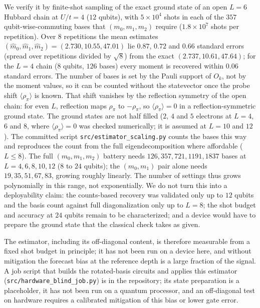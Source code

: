 \documentclass[aps,prb,onecolumn,superscriptaddress,longbibliography,floatfix]{revtex4-2}
\begin{document}
We verify it by finite-shot sampling of the exact ground state of an open $L=6$ Hubbard chain at $U/t=4$ ($12$ qubits), with $5\times10^4$ shots in each of the $357$ qubit-wise-commuting bases that $(m_0,m_1,m_2)$ require ($1.8\times10^7$ shots per repetition). Over $8$ repetitions the mean estimates $(\widehat m_0,\widehat m_1,\widehat m_2)=(2.730,10.55,47.01)$ lie $0.87$, $0.72$ and $0.66$ standard errors (spread over repetitions divided by $\sqrt8$) from the exact $(2.737,10.61,47.64)$; for the $L=4$ chain ($8$ qubits, $126$ bases) every moment is recovered within $0.06$ standard errors. The number of bases is set by the Pauli support of $O_k$, not by the moment values, so it can be counted without the statevector once the probe shift $\langle\rho_\pi\rangle$ is known. That shift vanishes by the reflection symmetry of the open chain: for even $L$, reflection maps $\rho_\pi$ to $-\rho_\pi$, so $\langle\rho_\pi\rangle=0$ in a reflection-symmetric ground state. The ground states are not half filled ($2$, $4$ and $5$ electrons at $L=4$, $6$ and $8$, where $\langle\rho_\pi\rangle=0$ was checked numerically; it is assumed at $L=10$ and $12$). The committed script \texttt{src/\allowbreak estimator\_scaling.py} counts the bases this way and reproduces the count from the full eigendecomposition where affordable ($L\le8$). The full $(m_0,m_1,m_2)$ battery needs $126,357,721,1191,1837$ bases at $L=4,6,8,10,12$ ($8$ to $24$ qubits); the $(m_0,m_1)$ pair alone needs $19,35,51,67,83$, growing roughly linearly. The number of settings thus grows polynomially in this range, not exponentially. We do not turn this into a deployability claim: the counts-based recovery was validated only up to $12$ qubits and the basis count against full diagonalization only up to $L=8$; the shot budget and accuracy at $24$ qubits remain to be characterized; and a device would have to prepare the ground state that the classical check takes as given.

The estimator, including its off-diagonal content, is therefore measurable from a fixed shot budget in principle; it has not been run on a device here, and without mitigation the forecast bias at the reference depth is a large fraction of the signal. A job script that builds the rotated-basis circuits and applies this estimator (\texttt{src/\allowbreak hardware\_blind\_job.py}) is in the repository; its state preparation is a placeholder, it has not been run on a quantum processor, and an off-diagonal test on hardware requires a calibrated mitigation of this bias or lower gate error.
\end{document}
